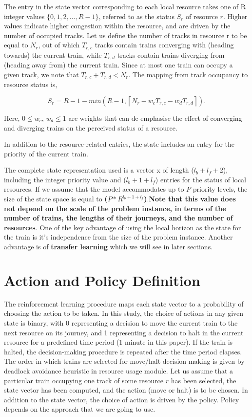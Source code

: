 \vspace{\baselineskip}
The entry in the state vector corresponding to each local
resource takes one of R integer values $ \{0, 1, 2,..., R-1\} $,
referred to as the status $S_r$ of resource $r$. Higher values
indicate higher congestion within the resource, and are driven
by the number of occupied tracks.
Let us define the number
of tracks in resource r to be equal to $N_r$, out of which $T_{r,c}$
tracks contain trains converging with (heading towards) the
current train, while $T_{r,d}$ tracks contain trains diverging from
(heading away from) the current train. Since at most one train
can occupy a given track, we note that $T_{r,c} + T_{r,d} < N_r$. The
mapping from track occupancy to resource status is,

$$ S_r = R - 1 - min(R - 1, \left \lceil{N_r - w_c T_{r,c} - w_d T_{r,d} }\right \rceil ).$$

Here, $0 \leq w_c$, $w_d \leq 1$ are weights that can de-emphasise
the effect of converging and diverging trains on the perceived
status of a resource.

\vspace{\baselineskip}
In addition to the resource-related entries, the state includes
an entry for the priority of the current train.

\vspace{\baselineskip}
The complete state representation
used is a vector x of length ($l_b + l_f + 2$), including
the integer priority value and ($l_b + 1 + l_f$) entries for the status
of local resources. If we assume that the model accommodates
up to $P$ priority levels, the size of the state space is equal to
\textbf{($P * R^{l_b + 1 + l_f}$)}.\textbf{Note that this value does not depend on the
scale of the problem instance, in terms of the number of trains,
the lengths of their journeys, and the number of resources}.
One of the key advantage of using the local horizon as the state for the train is it's independence 
from the size of the problem instance. Another advantage is of \textbf{transfer learning} which we will see in later
sections.

\section{Action and Policy Definition}
The reinforcement learning procedure maps each state vector
 to a probability of choosing the action to be taken. In this
study, the choice of actions in any given state is binary, with
0 representing a decision to move the current train to the next
resource on its journey, and 1 representing a decision to halt
in the current resource for a predefined time period (1 minute
in this paper). If the train is halted, the decision-making
procedure is repeated after the time period elapses. The order
in which trains are selected for move/halt decision-making is given 
by deadlock avoidance heuristic in resource usage module. Let us assume that
a particular train occupying one track of some resource $r$ has
been selected, the state vector has been computed, and the
action (move or halt) is to be chosen. In addition to the state
vector, the choice of action is driven by the policy. Policy depends on the approach that we are going to use. 

